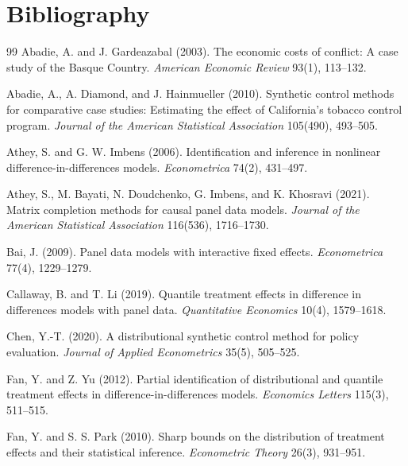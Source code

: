 \documentclass[11pt]{article}
\theoremstyle{definition}
\theoremstyle{plain}
\theoremstyle{remark}
\begin{document}
\section*{Bibliography}
\begin{thebibliography}{99}
Abadie, A. and J. Gardeazabal (2003).
The economic costs of conflict: A case study of the Basque Country.
\emph{American Economic Review} 93(1), 113--132.

Abadie, A., A. Diamond, and J. Hainmueller (2010).
Synthetic control methods for comparative case studies: Estimating the effect of California's tobacco control program.
\emph{Journal of the American Statistical Association} 105(490), 493--505.

Athey, S. and G. W. Imbens (2006).
Identification and inference in nonlinear difference-in-differences models.
\emph{Econometrica} 74(2), 431--497.

Athey, S., M. Bayati, N. Doudchenko, G. Imbens, and K. Khosravi (2021).
Matrix completion methods for causal panel data models.
\emph{Journal of the American Statistical Association} 116(536), 1716--1730.

Bai, J. (2009).
Panel data models with interactive fixed effects.
\emph{Econometrica} 77(4), 1229--1279.

Callaway, B. and T. Li (2019).
Quantile treatment effects in difference in differences models with panel data.
\emph{Quantitative Economics} 10(4), 1579--1618.

Chen, Y.-T. (2020).
A distributional synthetic control method for policy evaluation.
\emph{Journal of Applied Econometrics} 35(5), 505--525.

Fan, Y. and Z. Yu (2012).
Partial identification of distributional and quantile treatment effects in difference-in-differences models.
\emph{Economics Letters} 115(3), 511--515.

Fan, Y. and S. S. Park (2010).
Sharp bounds on the distribution of treatment effects and their statistical inference.
\emph{Econometric Theory} 26(3), 931--951.


\end{thebibliography}
\end{document}
